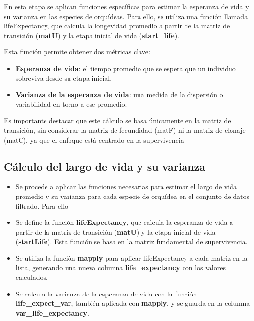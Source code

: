 \documentclass[
  12pt,
  letterpaper,
]{book}
\providecommand{\tightlist}{%
  \setlength{\itemsep}{0pt}\setlength{\parskip}{0pt}}\usepackage{longtable,booktabs,array}
\begin{document}
En esta etapa se aplican funciones específicas para estimar la esperanza
de vida y su varianza en las especies de orquídeas. Para ello, se
utiliza una función llamada lifeExpectancy, que calcula la longevidad
promedio a partir de la matriz de transición (\textbf{matU}) y la etapa
inicial de vida (\textbf{start\_life}).

Esta función permite obtener dos métricas clave:

\begin{itemize}
\tightlist
\item
  \textbf{Esperanza de vida}: el tiempo promedio que se espera que un
  individuo sobreviva desde su etapa inicial.
\item
  \textbf{Varianza de la esperanza de vida}: una medida de la dispersión
  o variabilidad en torno a ese promedio.
\end{itemize}

Es importante destacar que este cálculo se basa únicamente en la matriz
de transición, sin considerar la matriz de fecundidad (matF) ni la
matriz de clonaje (matC), ya que el enfoque está centrado en la
supervivencia.

\subsection{Cálculo del largo de vida y su
varianza}\label{cuxe1lculo-del-largo-de-vida-y-su-varianza}

\begin{itemize}
\item
  Se procede a aplicar las funciones necesarias para estimar el largo de
  vida promedio y su varianza para cada especie de orquídea en el
  conjunto de datos filtrado. Para ello:
\item
  Se define la función \textbf{lifeExpectancy}, que calcula la esperanza
  de vida a partir de la matriz de transición (\textbf{matU}) y la etapa
  inicial de vida (\textbf{startLife}). Esta función se basa en la
  matriz fundamental de supervivencia.
\item
  Se utiliza la función \textbf{mapply} para aplicar lifeExpectancy a
  cada matriz en la lista, generando una nueva columna
  \textbf{life\_expectancy} con los valores calculados.
\item
  Se calcula la varianza de la esperanza de vida con la función
  \textbf{life\_expect\_var}, también aplicada con \textbf{mapply}, y se
  guarda en la columna \textbf{var\_life\_expectancy}.
\end{itemize}
\end{document}
